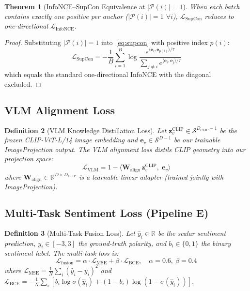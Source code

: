 \documentclass[10pt,conference]{IEEEtran}
\theoremstyle{ieeethm}
\newtheorem{theorem}{Theorem}
\theoremstyle{ieeedef}
\newtheorem{definition}[theorem]{Definition}
\theoremstyle{ieeeremark}
\begin{document}
\begin{theorem}[InfoNCE--SupCon Equivalence at $|\mathcal{P}(i)|=1$]
\label{thm:equivalence}
When each batch contains exactly one positive per anchor ($|\mathcal{P}(i)| = 1$ $\forall i$), $\mathcal{L}_{\text{SupCon}}$ reduces to one-directional $\mathcal{L}_{\text{InfoNCE}}$.
\end{theorem}
\begin{proof}
Substituting $|\mathcal{P}(i)| = 1$ into~\eqref{eq:supcon} with positive index $p(i)$:
\[
\mathcal{L}_{\text{SupCon}} = -\frac{1}{B}\sum_{i=1}^B \log\frac{e^{\langle\mathbf{e}_i,\mathbf{e}_{p(i)}\rangle/\tau}}{\sum_{j \neq i}e^{\langle\mathbf{e}_i,\mathbf{e}_j\rangle/\tau}}
\]
which equals the standard one-directional InfoNCE with the diagonal excluded.
\end{proof}

\subsection{VLM Alignment Loss}

\begin{definition}[VLM Knowledge Distillation Loss]
\label{def:vlm_kd}
Let $\mathbf{z}_v^\text{CLIP} \in \mathcal{S}^{D_\text{CLIP}-1}$ be the frozen CLIP-ViT-L/14 image embedding and $\mathbf{e}_v \in \mathcal{S}^{D-1}$ be our trainable ImageProjection output. The VLM alignment loss distils CLIP geometry into our projection space:
\begin{equation}
\mathcal{L}_\text{VLM} = 1 - \langle \mathbf{W}_\text{align}\,\mathbf{z}_v^\text{CLIP},\; \mathbf{e}_v \rangle
\label{eq:vlm_kd}
\end{equation}
where $\mathbf{W}_\text{align} \in \mathbb{R}^{D \times D_\text{CLIP}}$ is a learnable linear adapter (trained jointly with ImageProjection).
\end{definition}

\subsection{Multi-Task Sentiment Loss (Pipeline E)}

\begin{definition}[Multi-Task Fusion Loss]
\label{def:multitask}
Let $\hat{y}_i \in \mathbb{R}$ be the scalar sentiment prediction, $y_i \in [-3,3]$ the ground-truth polarity, and $b_i \in \{0,1\}$ the binary sentiment label. The multi-task loss is:
\begin{equation}
\mathcal{L}_{\text{fusion}} = \alpha \cdot \mathcal{L}_{\text{MSE}} + \beta \cdot \mathcal{L}_{\text{BCE}},\quad \alpha=0.6,\ \beta=0.4
\label{eq:fusion_loss}
\end{equation}
where $\mathcal{L}_{\text{MSE}} = \frac{1}{N}\sum_i(\hat{y}_i - y_i)^2$ and $\mathcal{L}_{\text{BCE}} = -\frac{1}{N}\sum_i[b_i \log\sigma(\hat{y}_i) + (1{-}b_i)\log(1{-}\sigma(\hat{y}_i))]$.
\end{definition}
\end{document}
